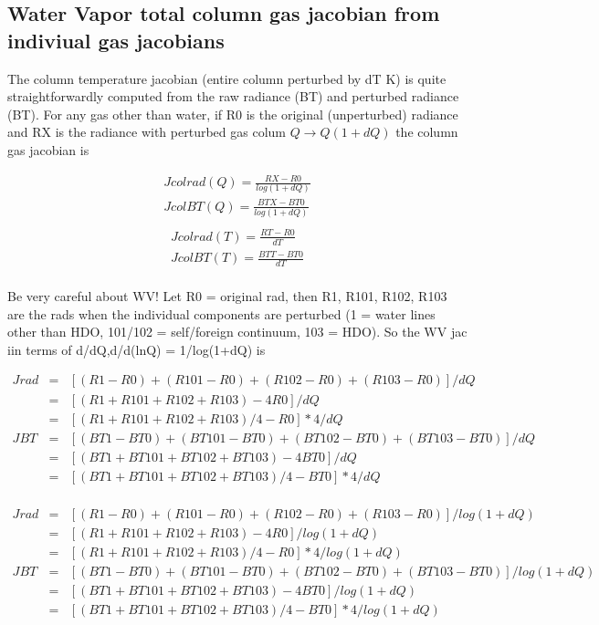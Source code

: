 \documentclass[12pt]{article}
\begin{document}
\subsection{Water Vapor total column gas jacobian from indiviual gas jacobians}

The column temperature jacobian (entire column perturbed by dT K) is
quite straightforwardly computed from the raw radiance (BT) and
perturbed radiance (BT).  For any gas other than water, if R0 is the
original (unperturbed) radiance and RX is the radiance with perturbed
gas colum $Q \rightarrow Q(1+dQ)$ the column gas jacobian is

\begin{eqnarray*}
Jcolrad(Q) = \frac{RX-R0}{log(1+dQ)} \\
JcolBT(Q) = \frac{BTX-BT0}{log(1+dQ)} \\
\end{eqnarray*}
\begin{eqnarray*}
Jcolrad(T) = \frac{RT-R0}{dT} \\
JcolBT(T) = \frac{BTT-BT0}{dT} \\
\end{eqnarray*}

Be very careful about WV!  Let R0 = original rad, then R1, R101, R102,
R103 are the rads when the individual components are perturbed (1 =
water lines other than HDO, 101/102 = self/foreign continuum, 103 =
HDO). So the WV jac iin terms of d/dQ,d/d(lnQ) = 1/log(1+dQ) is

\begin{eqnarray*}
Jrad  & = & [(R1-R0) + (R101-R0) + (R102-R0) + (R103-R0)]/dQ \\
   & = & [(R1+R101+R102+R103)-4R0]/dQ \\
   & = & [(R1+R101+R102+R103)/4-R0] * 4/dQ \\
JBT  & = & [(BT1-BT0) + (BT101-BT0) + (BT102-BT0) + (BT103-BT0)]/dQ \\
   & = & [(BT1+BT101+BT102+BT103)-4BT0]/dQ \\
   & = & [(BT1+BT101+BT102+BT103)/4-BT0] * 4/dQ\\
\end{eqnarray*}

\begin{eqnarray*}
Jrad  & = & [(R1-R0) + (R101-R0) + (R102-R0) + (R103-R0)]/log(1+dQ) \\
   & = & [(R1+R101+R102+R103)-4R0]/log(1+dQ) \\
   & = & [(R1+R101+R102+R103)/4-R0] * 4/log(1+dQ) \\
JBT  & = & [(BT1-BT0) + (BT101-BT0) + (BT102-BT0) + (BT103-BT0)]/log(1+dQ) \\
   & = & [(BT1+BT101+BT102+BT103)-4BT0]/log(1+dQ) \\
   & = & [(BT1+BT101+BT102+BT103)/4-BT0] * 4/log(1+dQ)\\
\end{eqnarray*}
\end{document}

